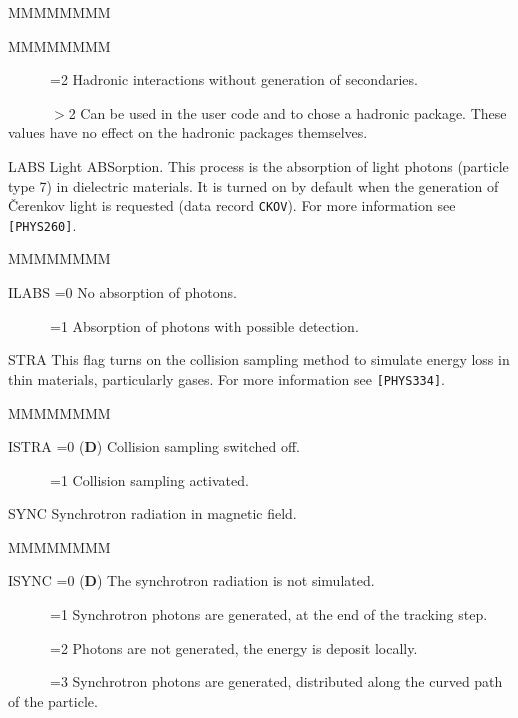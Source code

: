 \begin{DLtt}{MMMMMMMM}
\begin{DLtt}{MMMMMMMM}
\item[~~~~~~=2] Hadronic interactions without generation of secondaries.
\item[~~~~~~$>$2] Can be used in the user code  and 
to chose a hadronic package. These values have no effect on the hadronic
packages themselves.
\end{DLtt}
\item[LABS] Light ABSorption. This process is the absorption of light photons
(particle type 7) in dielectric materials. It is turned on by default when
the generation of \v{C}erenkov light is requested (data record {\tt CKOV}).
For more information see {\tt [PHYS260]}.
\begin{DLtt}{MMMMMMMM}
\item[ILABS =0] No absorption of photons.
\item[~~~~~~=1] Absorption of photons with possible detection.
\end{DLtt}
\item[STRA]
This flag turns on the collision sampling method to simulate energy
loss in thin materials, particularly gases. For more information see
{\tt [PHYS334]}.
\begin{DLtt}{MMMMMMMM}
\item[ISTRA =0] ({\bf D}) Collision sampling switched off.
\item[~~~~~~=1] Collision sampling activated.
\end{DLtt}
\item[SYNC] Synchrotron radiation in magnetic field.
\begin{DLtt}{MMMMMMMM}
\item[ISYNC =0] ({\bf D}) The synchrotron radiation is not simulated.
\item[~~~~~~=1] Synchrotron photons are generated,
at the end of the tracking step.
\item[~~~~~~=2] Photons are not generated, the energy is deposit locally.
\item[~~~~~~=3] Synchrotron photons are generated,
distributed along the curved path of the particle.
\end{DLtt}
\end{DLtt}
